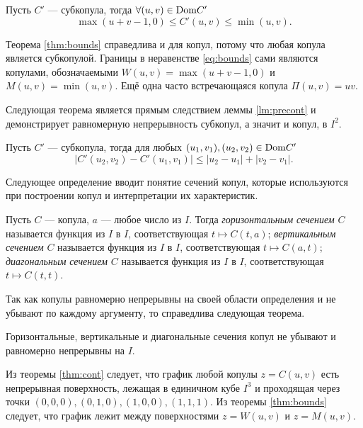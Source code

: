 \begin{theorem}\label{thm:bounds}
	Пусть $C'$ --- субкопула, тогда $\forall (u, v) \in \mathrm{Dom}{C'}$
	\begin{equation}\label{eq:bounds}
		\max (u + v - 1, 0) \leqslant C'(u, v) \leqslant \min (u, v).
	\end{equation}
\end{theorem}

Теорема \ref{thm:bounds} справедлива и для копул, потому что любая копула является субкопулой. Границы в неравенстве \eqref{eq:bounds} сами являются копулами, обозначаемыми $W(u, v) = \max (u + v - 1, 0)$ и $M(u, v) = \min (u, v)$. Ещё одна часто встречающаяся копула $\Pi(u, v) = uv$.

Следующая теорема является прямым следствием леммы \ref{lm:precont} и демонстрирует равномерную непрерывность субкопул, а значит и копул, в $I^2$.

\begin{theorem}\label{thm:cont}
	Пусть $C'$ --- субкопула, тогда для любых $(u_1, v_1), (u_2, v_2) \in \mathrm{Dom}{C'}$
\[
|C'(u_2, v_2) - C'(u_1, v_1)| \leqslant |u_2 - u_1| + |v_2 - v_1|.
\]
\end{theorem}

Следующее определение вводит понятие сечений копул, которые используются при построении копул и интерпретации их характеристик.

\begin{define}
	Пусть $C$ --- копула, $a$ --- любое число из $I$. Тогда \emph{горизонтальным сечением} $C$ называется функция из $I$ в $I$, соответствующая $t \mapsto C(t, a)$; \emph{вертикальным сечением} $C$ называется функция из $I$ в $I$, соответствующая $t \mapsto C(a, t)$; \emph{диагональным сечением} $C$ называется функция из $I$ в $I$, соответствующая $t \mapsto C(t, t)$.
\end{define}

Так как копулы равномерно непрерывны на своей области определения и не убывают по каждому аргументу, то справедлива следующая теорема.

\begin{theorem}\label{thm:sections}
	Горизонтальные, вертикальные и диагональные сечения копул не убывают и равномерно непрерывны на $I$.
\end{theorem}

Из теоремы \ref{thm:cont} следует, что график любой копулы $z = C(u, v)$ есть непрерывная поверхность, лежащая в единичном кубе $I^3$ и проходящая через точки $(0, 0, 0), (0, 1, 0), (1, 0, 0), (1, 1, 1)$. Из теоремы \ref{thm:bounds} следует, что график лежит между поверхностями $z = W(u, v)$ и $z = M(u, v)$.

